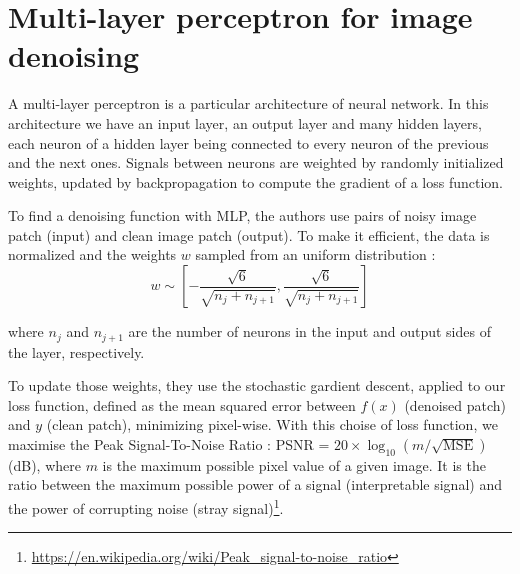\documentclass[10pt,a4paper]{article}
\newcommand{\svs}{\vspace{9pt}}
\begin{document}





\section{Multi-layer perceptron for image denoising}

A multi-layer perceptron is a particular architecture of neural network. In this architecture we have an input layer, an output layer and many hidden layers, each neuron of a hidden layer being connected to every neuron of the previous and the next ones. Signals between neurons are weighted by randomly initialized weights, updated by backpropagation to compute the gradient of a loss function.

\svs

To find a denoising function with MLP, the authors use pairs of noisy image patch (input) and clean image patch (output). To make it efficient, the data is normalized and the weights $w$ sampled from an uniform distribution :  \\%
$$w \sim \left[-\frac{\sqrt{6}}{\sqrt{n_j + n_{j+1}}}, \frac{\sqrt{6}}{\sqrt{n_j + n_{j+1}}}\right]$$ 

\svs
where $n_j$ and $n_{j+1}$ are the number of neurons in the input and output sides of the layer, respectively.

\svs

To update those weights, they use the stochastic gardient descent, applied to our loss function, defined as the mean squared error between $f(x)$ (denoised patch) and $y$ (clean patch), minimizing pixel-wise. With this choise of loss function, we maximise the Peak Signal-To-Noise Ratio : PSNR = $20 \times \log_{10}(m/\sqrt{\mathrm{MSE}})$ (dB), where $m$ is the maximum possible pixel value of a given image. It is the ratio between the maximum possible power of a signal (interpretable signal) and the power of corrupting noise (stray signal)\footnote{\href{https://en.wikipedia.org/wiki/Peak\_signal-to-noise\_ratio}{https://en.wikipedia.org/wiki/Peak\_signal-to-noise\_ratio}}.
\end{document}
